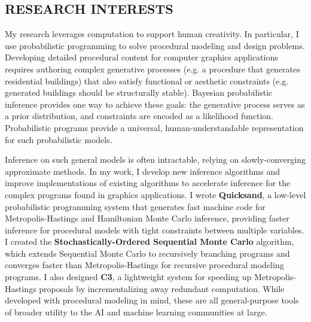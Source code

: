 \documentclass[line,margin]{res}
\begin{document}
\address{\url{dritchie@stanford.edu} $\cdot$ (530) 409-6656}
\address{353 Serra Mall \#381, Stanford, CA 94305}
 
\begin{resume}

\section{RESEARCH INTERESTS}
My research leverages computation to support human creativity.
In particular, I use probabilistic programming to solve procedural modeling and design problems. Developing detailed procedural content for computer graphics applications requires authoring complex generative processes (e.g. a procedure that generates residential buildings) that also satisfy functional or aesthetic constraints (e.g. generated buildings should be structurally stable). Bayesian probabilistic inference provides one way to achieve these goals: the generative process serves as a prior distribution, and constraints are encoded as a likelihood function. Probabilistic programs provide a universal, human-understandable representation for such probabilistic models. 

Inference on such general models is often intractable, relying on slowly-converging approximate methods. In my work, I develop new inference algorithms and improve implementations of existing algorithms to accelerate inference for the complex programs found in graphics applications. I wrote \textbf{Quicksand}, a low-level probabilistic programming system that generates fast machine code for Metropolis-Hastings and Hamiltonian Monte Carlo inference, providing faster inference for procedural models with tight constraints between multiple variables. I created the \textbf{Stochastically-Ordered Sequential Monte Carlo} algorithm, which extends Sequential Monte Carlo to recursively branching programs and converges faster than Metropolis-Hastings for recursive procedural modeling programs. I also designed \textbf{C3}, a lightweight system for speeding up Metropolis-Hastings proposals by incrementalizing away redundant computation. While developed with procedural modeling in mind, these are all general-purpose tools of broader utility to the AI and machine learning communities at large.
 

\end{resume}
\end{document}
